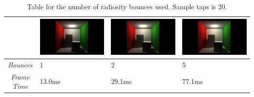 \begin{table}[!ht]
\begin{center}
\begin{tabular}{| c | p{3.5cm} | p{3.5cm} | p{3.5cm} |}
\hline
&
\includegraphics[scale=0.1,trim=0 0 0 -5]{img/results/radiosity/1bounce} &
\includegraphics[scale=0.1,trim=0 0 0 -5]{img/results/radiosity/2bounce} &
\includegraphics[scale=0.1,trim=0 0 0 -5]{img/results/radiosity/5bounce} \\
\hline
\emph{Bounces} & 1 & 2 & 5 \\
\hline
\emph{Frame Time} & 13.0ms & 29.1ms & 77.1ms\\
\hline
\end{tabular}
\caption{Table for the number of radiosity bounces used. Sample taps is 20.}
\label{table-rad-bounces}
\end{center}
\end{table}

